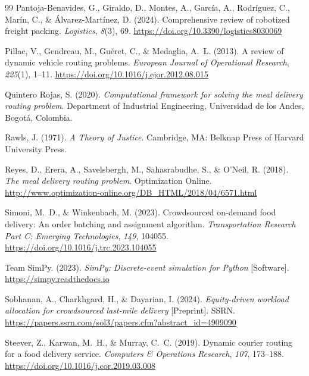 \documentclass[12pt,a4paper]{report}
\begin{document}
\begin{thebibliography}{99}
Pantoja-Benavides, G., Giraldo, D., Montes, A., Garc\'{i}a, A., Rodr\'{i}guez, C., Mar\'{i}n, C., \& \'{A}lvarez-Mart\'{i}nez, D. (2024).
\newblock Comprehensive review of robotized freight packing.
\newblock \textit{Logistics}, \textit{8}(3), 69.
\newblock \url{https://doi.org/10.3390/logistics8030069}

Pillac, V., Gendreau, M., Gu\'{e}ret, C., \& Medaglia, A.~L. (2013).
\newblock A review of dynamic vehicle routing problems.
\newblock \textit{European Journal of Operational Research}, \textit{225}(1), 1--11.
\newblock \url{https://doi.org/10.1016/j.ejor.2012.08.015}

Quintero Rojas, S. (2020).
\newblock \textit{Computational framework for solving the meal delivery routing problem}.
\newblock Department of Industrial Engineering, Universidad de los Andes, Bogot\'{a}, Colombia.

Rawls, J. (1971).
\newblock \textit{A Theory of Justice}.
\newblock Cambridge, MA: Belknap Press of Harvard University Press.

Reyes, D., Erera, A., Savelsbergh, M., Sahasrabudhe, S., \& O'Neil, R. (2018).
\newblock \textit{The meal delivery routing problem}.
\newblock Optimization Online.
\newblock \url{http://www.optimization-online.org/DB_HTML/2018/04/6571.html}

Simoni, M.~D., \& Winkenbach, M. (2023).
\newblock Crowdsourced on-demand food delivery: An order batching and assignment algorithm.
\newblock \textit{Transportation Research Part C: Emerging Technologies}, \textit{149}, 104055.
\newblock \url{https://doi.org/10.1016/j.trc.2023.104055}

{Team SimPy}. (2023).
\newblock \textit{{SimPy}: Discrete-event simulation for {Python}} [Software].
\newblock \url{https://simpy.readthedocs.io}

Sobhanan, A., Charkhgard, H., \& Dayarian, I. (2024).
\newblock \textit{Equity-driven workload allocation for crowdsourced last-mile delivery} [Preprint].
\newblock SSRN.
\newblock \url{https://papers.ssrn.com/sol3/papers.cfm?abstract_id=4909090}

Steever, Z., Karwan, M.~H., \& Murray, C.~C. (2019).
\newblock Dynamic courier routing for a food delivery service.
\newblock \textit{Computers \& Operations Research}, \textit{107}, 173--188.
\newblock \url{https://doi.org/10.1016/j.cor.2019.03.008}


\end{thebibliography}
\end{document}
